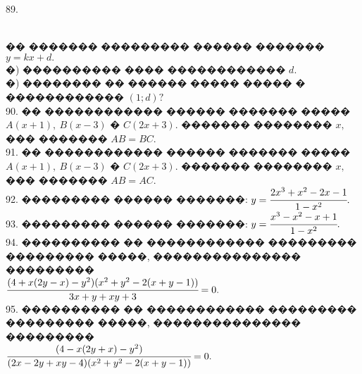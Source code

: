 \documentclass[12pt]{article}
\begin{document}
89. \begin{figure}[ht!]
\end{figure}\\
�� ������� ��������� ������ ������� $y=kx+d.$\\
�) ���������� ���� ������������ $d.$\\
�) �������� �� ������ ����� ����� � ������������ $(1; d) ?$\\
90. �� ������������ ������ ������� ����� $A(x + 1),\ B(x - 3)$ � $C(2x + 3).$ ������� �������� $x,$ ��� ������� $AB = BC.$\\
91. �� ������������ ������ ������� ����� $A(x + 1),\ B(x - 3)$ � $C(2x + 3).$ ������� �������� $x,$ ��� ������� $AB = AC.$\\
92. ��������� ������ �������: $y=\cfrac{2x^3+x^2-2x-1}{1-x^2}.$\\
93. ��������� ������ �������: $y=\cfrac{x^3-x^2-x+1}{1-x^2}.$\\
94. ���������� �� ������������ ��������� ��������� �����, ��������������� ��������� \\$\cfrac{(4+x(2y-x)-y^2)(x^2+y^2-2(x+y-1))}{3x+y+xy+3}=0.$\\
95. ���������� �� ������������ ��������� ��������� �����, ��������������� ��������� \\ $\cfrac{(4-x(2y+x)-y^2)}{(2x-2y+xy-4)(x^2+y^2-2(x+y-1))}=0.$
\newpage
\end{document}
